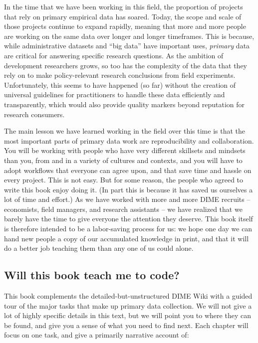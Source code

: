 In the time that we have been working in this field,
the proportion of projects that rely on primary empirical data has soared. \cite{angrist2017economic}
Today, the scope and scale of those projects continue to expand rapidly,
meaning that more and more people are working on the same data over longer and longer timeframes.
This is because, while administrative datasets and ``big data'' have important uses,
\textit{primary} data are critical for answering specific research questions.
As the ambition of development researchers grows, so too has the complexity of the data
that they rely on to make policy-relevant research conclusions from field experiments.
Unfortunately, this seems to have happened (so far) without the creation of
universal guidelines for practitioners to handle these data efficiently and transparently,
which would also provide quality markers beyond reputation for research consumers.

The main lesson we have learned working in the field over this time is that
the most important parts of primary data work are reproducibility and collaboration.
You will be working with people who have very different skillsets and mindsets than you,
from and in a variety of cultures and contexts, and you will have to adopt workflows
that everyone can agree upon, and that save time and hassle on every project.
This is not easy. But for some reason, the people who agreed to write this book enjoy doing it.
(In part this is because it has saved us ourselves a lot of time and effort.)
As we have worked with more and more DIME recruits -- economists, field managers, and research assistants --
we have realized that we barely have the time to give everyone the attention they deserve.
This book itself is therefore intended to be a labor-saving process for us:
we hope one day we can hand new people a copy of our accumulated knowledge in print,
and that it will do a better job teaching them than any one of us could alone.

\subsection{Will this book teach me to code?}

This book complements the detailed-but-unstructured DIME Wiki
with a guided tour of the major tasks that make up primary data collection.
We will not give a lot of highly specific details in this text,
but we will point you to where they can be found, and give you a sense of what you need to find next.
Each chapter will focus on one task, and give a primarily narrative account of:

